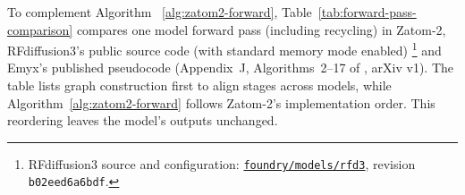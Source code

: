 \documentclass{article} %
\begin{document}
To complement Algorithm ~\ref{alg:zatom2-forward}, Table~\ref{tab:forward-pass-comparison} compares one model forward pass (including recycling) in Zatom-2, RFdiffusion3's public source code (with standard memory mode enabled) \citep{butcher2025rfdiffusion3}\footnote{RFdiffusion3 source and configuration: \href{https://github.com/RosettaCommons/foundry/tree/b02eed6a6bdf8f44d14a80cc36e3da13c9f2291c/models/rfd3}{\texttt{foundry/models/rfd3}}, revision \texttt{b02eed6a6bdf}.} and Emyx's published pseudocode (Appendix~J, Algorithms~2--17 of \citealp{williams2026emyx}, arXiv v1). The table lists graph construction first to align stages across models, while Algorithm~\ref{alg:zatom2-forward} follows Zatom-2's implementation order. This reordering leaves the model's outputs unchanged.

\begingroup
  \small
  \setlength{\tabcolsep}{3pt}
  \setlength{\LTcapwidth}{\textwidth}
  \renewcommand{\arraystretch}{1.0}
\end{document}
